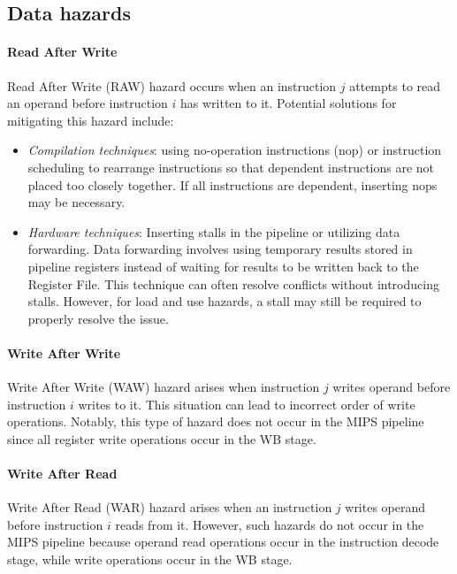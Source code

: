 \subsection{Data hazards}
\paragraph*{Read After Write}
Read After Write (RAW) hazard occurs when an instruction $j$ attempts to read an operand before instruction $i$ has written to it. 
Potential solutions for mitigating this hazard include:
\begin{itemize}
    \item \textit{Compilation techniques}: using no-operation instructions (nop) or instruction scheduling to rearrange instructions so that dependent instructions are not placed too closely together. 
        If all instructions are dependent, inserting nops may be necessary.
    \item \textit{Hardware techniques}: Inserting stalls in the pipeline or utilizing data forwarding. 
        Data forwarding involves using temporary results stored in pipeline registers instead of waiting for results to be written back to the Register File. 
        This technique can often resolve conflicts without introducing stalls. 
        However, for load and use hazards, a stall may still be required to properly resolve the issue.
\end{itemize}

\paragraph*{Write After Write}
Write After Write (WAW) hazard arises when instruction $j$ writes operand before instruction $i$ writes to it.
This situation can lead to incorrect order of write operations. 
Notably, this type of hazard does not occur in the MIPS pipeline since all register write operations occur in the WB stage.

\paragraph*{Write After Read}
Write After Read (WAR) hazard arises when an instruction $j$ writes operand before instruction $i$ reads from it.
However, such hazards do not occur in the MIPS pipeline because operand read operations occur in the instruction decode stage, while write operations occur in the WB stage.